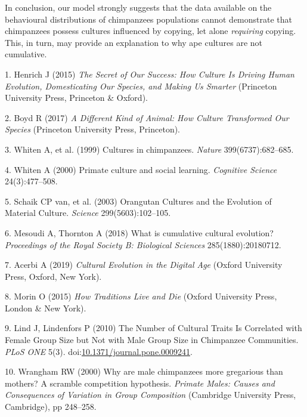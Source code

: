 \documentclass[9pt,twocolumn,twoside,]{pnas-new}
\begin{document}
In conclusion, our model strongly suggests that the data available on
the behavioural distributions of chimpanzees populations cannot
demonstrate that chimpanzees possess cultures influenced by copying, let
alone \emph{requiring} copying. This, in turn, may provide an
explanation to why ape cultures are not cumulative.

\showmatmethods
\showacknow
\pnasbreak

\hypertarget{refs}{}
\hypertarget{ref-henrich_secret_2015}{}
1. Henrich J (2015) \emph{The Secret of Our Success: How Culture Is
Driving Human Evolution, Domesticating Our Species, and Making Us
Smarter} (Princeton University Press, Princeton \& Oxford).

\hypertarget{ref-boyd_different_2017}{}
2. Boyd R (2017) \emph{A Different Kind of Animal: How Culture
Transformed Our Species} (Princeton University Press, Princeton).

\hypertarget{ref-whiten_cultures_1999}{}
3. Whiten A, et al. (1999) Cultures in chimpanzees. \emph{Nature}
399(6737):682--685.

\hypertarget{ref-whiten_primate_2000}{}
4. Whiten A (2000) Primate culture and social learning. \emph{Cognitive
Science} 24(3):477--508.

\hypertarget{ref-van_schaik_orangutan_2003}{}
5. Schaik CP van, et al. (2003) Orangutan Cultures and the Evolution of
Material Culture. \emph{Science} 299(5603):102--105.

\hypertarget{ref-mesoudi_what_2018}{}
6. Mesoudi A, Thornton A (2018) What is cumulative cultural evolution?
\emph{Proceedings of the Royal Society B: Biological Sciences}
285(1880):20180712.

\hypertarget{ref-acerbi_cultural_2019}{}
7. Acerbi A (2019) \emph{Cultural Evolution in the Digital Age} (Oxford
University Press, Oxford, New York).

\hypertarget{ref-morin_how_2015}{}
8. Morin O (2015) \emph{How Traditions Live and Die} (Oxford University
Press, London \& New York).

\hypertarget{ref-lind_number_2010}{}
9. Lind J, Lindenfors P (2010) The Number of Cultural Traits Is
Correlated with Female Group Size but Not with Male Group Size in
Chimpanzee Communities. \emph{PLoS ONE} 5(3).
doi:\href{https://doi.org/10.1371/journal.pone.0009241}{10.1371/journal.pone.0009241}.

\hypertarget{ref-wrangham_why_2000}{}
10. Wrangham RW (2000) Why are male chimpanzees more gregarious than
mothers? A scramble competition hypothesis. \emph{Primate Males: Causes
and Consequences of Variation in Group Composition} (Cambridge
University Press, Cambridge), pp 248--258.
\end{document}

